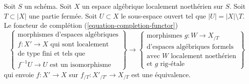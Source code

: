 \begin{theorem}
\label{theorem-dilatations-general}
Soit $S$ un schéma. Soit $X$ un espace algébrique localement noethérien sur
$S$. Soit $T \subset |X|$ une partie fermée. Soit $U \subset X$ le
sous-espace ouvert tel que $|U| = |X| \setminus T$. Le foncteur de complétion
(\ref{equation-completion-functor})
$$
\left\{
\begin{matrix}
\text{morphismes d'espaces algébriques}\\
f : X' \to X\text{ qui sont localement}\\
\text{de type fini et tels que}\\
f^{-1}U \to U\text{ est un isomorphisme}
\end{matrix}
\right\}
\longrightarrow
\left\{
\begin{matrix}
\text{morphismes }g : W \to X_{/T}\\
\text{d'espaces algébriques formels}\\
\text{avec }W\text{ localement noethérien}\\
\text{et }g\text{ rig-étale}
\end{matrix}
\right\}
$$
qui envoie $f : X' \to X$ sur $f_{/T} : X'_{/T'} \to X_{/T}$ est une équivalence.
\end{theorem}

